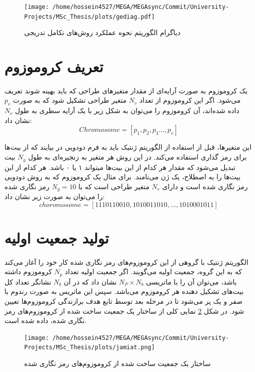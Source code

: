 \documentclass[a4paper,titlepage,12pt,fleqn,oneside]{report}
\begin{document}
	\begin{figure}[ht]
		\centering
		\texttt{[image: /home/hossein4527/MEGA/MEGAsync/Commit/University-Projects/MSc\_Thesis/plots/gediag.pdf]}
		\caption{دیاگرام الگوریتم نحوه عملکرد روش‌های تکامل تدریجی}
		\label{fig:gediag}
	\end{figure}
	
	\section{تعریف کروموزوم}
	\paragraph{}
	یک کروموزوم به صورت آرایه‌ای از مقدار متغیر‌های طراحی که باید بهینه شوند تعریف می‌شود. اگر این کروموزوم از تعداد $N_{v}$ متغیر طراحی تشکیل شود که به صورت $p_{v}$ داده شده‌ا‌ند، آن کروموزوم را می‌توان به شکل زیر با یک آرایه سطری به طول $N_{v}$ نشان داد:
	\begin{equation}
		Chromosome =\left[p_{1}, p_{2}, p_{3} \ldots, p_{v}\right]
	\end{equation}
	
	این متغیر‌ها، قبل از استفاده از الگوریتم ژنتیک باید به فرم دودویی در بیایند که از بیت‌ها برای رمز گذاری استفاده می‌کند. در این روش هر متغیر به زنجیره‌ای به طول $N_{g}$ بیت تبدیل می‌شود که مقدار هر کدام از این بیت‌ها میتواند ۱ یا ۰ باشد. هر کدام از این بیت‌ها را به اصطلاح، یک ژن می‌نامند. برای مثال یک کروموزوم که به روش دودویی رمز نگاری شده است و دارای $N_{v}$ متغیر طراحی است که با $N_{g}=10$ رمز نگاری شده‌ را می‌توان به صورت زیر نشان داد:
	\begin{equation}
		choromosome = [1110110010,1010011010, \ldots, 1010001011]
	\end{equation}
	
	\section{تولید جمعیت اولیه}
	\paragraph{}
	الگوریتم ژنتیک با گروهی از این کروموزوم‌های رمز نگاری شده کار خود را آغاز می‌کند که به این گروه، جمعیت اولیه می‌گویند. اگر جمعیت اولیه تعداد $N_{p}$ کروموزوم داشته باشد، می‌توان آن را با ماتریسی $N_{P} \times N_{b}$ نشان داد که در آن $N_{b}$ نشانگر تعداد کل بیت‌های تشکیل دهنده هر کروموزوم می‌باشد. سپس این ماتریس به صورت رندوم با صفر و یک پر می‌شود تا در مرحله بعد توسط تابع هدف برازندگی کروموزوم‌ها تعیین شود. در شکل%
	\ref{fig:jamiat}
	نمایی کلی از ساختار یک جمعیت ساخت شده از کروموزوم‌های رمز نگاری شده، داده شده است.
	\begin{figure}[ht]
		\centering
		\texttt{[image: /home/hossein4527/MEGA/MEGAsync/Commit/University-Projects/MSc\_Thesis/plots/jamiat.png]}
		\caption{ساختار یک جمعیت ساخت شده از کروموزوم‌های رمز نگاری شده}
		\label{fig:jamiat}
	\end{figure}
	
\end{document}
